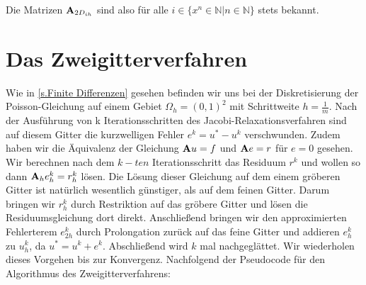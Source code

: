 Die Matrizen ${\textbf{A}}_{2D_{ih}}$ sind also für alle $i \in \{x^{n} \in \mathbb{N} | n \in \mathbb{N} \}$ stets bekannt.

\section{Das Zweigitterverfahren}\label{s.Der Zweigitter-Algorithmus}

Wie in \autoref{s.Finite Differenzen} gesehen befinden wir uns bei der Diskretisierung der Poisson-Gleichung auf einem Gebiet $\Omega_{h} = (0,1)^{2}$ mit Schrittweite $h = \frac {1} {m}$. Nach der Ausführung von k Iterationsschritten des Jacobi-Relaxationsverfahren sind auf diesem Gitter die kurzwelligen Fehler $e^{k} = u^{*} - u^{k}$ verschwunden. Zudem haben wir die Äquivalenz der Gleichung ${\textbf{A}} u = f$ und ${\textbf{A}} e = r$ für $e = 0$ gesehen.\\
Wir berechnen nach dem $k-ten$ Iterationsschritt das Residuum $r^{k}$ und wollen so dann ${\textbf{A}}_{h} e^{k}_{h} = r^{k}_{h}$ lösen. Die Lösung dieser Gleichung auf dem einem gröberen Gitter ist natürlich wesentlich günstiger, als auf dem feinen Gitter. Darum bringen wir $r^{k}_{h}$ durch Restriktion auf das gröbere Gitter und lösen die Residuumsgleichung dort direkt. Anschließend bringen wir den approximierten Fehlerterem $e_{2h}^{k}$ durch Prolongation zurück auf das feine Gitter und addieren $e_{h}^{k}$ zu $u_{h}^{k}$, da $u^{*} = u^{k} + e^{k}$. Abschließend wird $k$ mal nachgeglättet. Wir wiederholen dieses Vorgehen bis zur Konvergenz. Nachfolgend der Pseudocode für den Algorithmus des Zweigitterverfahrens:


